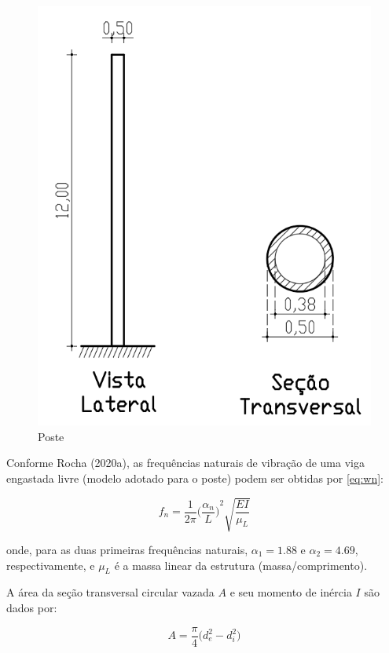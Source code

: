 \begin{figure}
\centering
\includegraphics[scale=0.5]{Poste.png}
\caption{Poste}
\end{figure}

    Conforme Rocha (2020a), as frequências naturais de vibração de uma viga
engastada livre (modelo adotado para o poste) podem ser obtidas por
\ref{eq:wn}:

\begin{equation}
f_n = \frac{1}{2\pi} {\Big( \frac{\alpha_n}{L} \Big)}^2 \sqrt{\frac{EI}{\mu_L}}
\label{eq:wn}
\end{equation}

onde, para as duas primeiras frequências naturais, \(\alpha_1=1.88\) e
\(\alpha_2=4.69\), respectivamente, e \(\mu_L\) é a massa linear da
estrutura (massa/comprimento).

A área da seção transversal circular vazada \(A\) e seu momento de
inércia \(I\) são dados por:

\begin{equation}
A = \frac{\pi}{4}\big(d_e^2 - d_i^2 \big)
\label{eq:Ac}
\end{equation}

